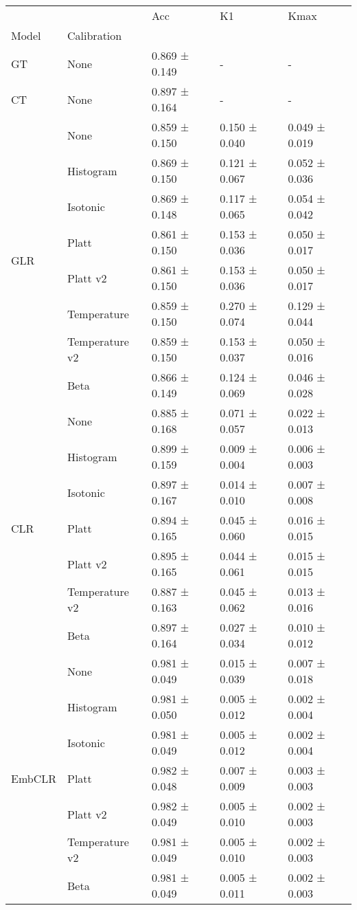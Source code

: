 \begin{tabular}{lllll}
\toprule
 &  & Acc & K1 & Kmax \\
Model & Calibration &  &  &  \\
\midrule
GT & None & 0.869 ± 0.149 & - & - \\
\cline{1-5}
CT & None & 0.897 ± 0.164 & - & - \\
\cline{1-5}
\multirow[t]{8}{*}{GLR} & None & 0.859 ± 0.150 & 0.150 ± 0.040 & 0.049 ± 0.019 \\
 & Histogram & 0.869 ± 0.150 & 0.121 ± 0.067 & 0.052 ± 0.036 \\
 & Isotonic & 0.869 ± 0.148 & 0.117 ± 0.065 & 0.054 ± 0.042 \\
 & Platt & 0.861 ± 0.150 & 0.153 ± 0.036 & 0.050 ± 0.017 \\
 & Platt v2 & 0.861 ± 0.150 & 0.153 ± 0.036 & 0.050 ± 0.017 \\
 & Temperature & 0.859 ± 0.150 & 0.270 ± 0.074 & 0.129 ± 0.044 \\
 & Temperature v2 & 0.859 ± 0.150 & 0.153 ± 0.037 & 0.050 ± 0.016 \\
 & Beta & 0.866 ± 0.149 & 0.124 ± 0.069 & 0.046 ± 0.028 \\
\cline{1-5}
\multirow[t]{7}{*}{CLR} & None & 0.885 ± 0.168 & 0.071 ± 0.057 & 0.022 ± 0.013 \\
 & Histogram & 0.899 ± 0.159 & 0.009 ± 0.004 & 0.006 ± 0.003 \\
 & Isotonic & 0.897 ± 0.167 & 0.014 ± 0.010 & 0.007 ± 0.008 \\
 & Platt & 0.894 ± 0.165 & 0.045 ± 0.060 & 0.016 ± 0.015 \\
 & Platt v2 & 0.895 ± 0.165 & 0.044 ± 0.061 & 0.015 ± 0.015 \\
 & Temperature v2 & 0.887 ± 0.163 & 0.045 ± 0.062 & 0.013 ± 0.016 \\
 & Beta & 0.897 ± 0.164 & 0.027 ± 0.034 & 0.010 ± 0.012 \\
\cline{1-5}
\multirow[t]{7}{*}{EmbCLR} & None & 0.981 ± 0.049 & 0.015 ± 0.039 & 0.007 ± 0.018 \\
 & Histogram & 0.981 ± 0.050 & 0.005 ± 0.012 & 0.002 ± 0.004 \\
 & Isotonic & 0.981 ± 0.049 & 0.005 ± 0.012 & 0.002 ± 0.004 \\
 & Platt & 0.982 ± 0.048 & 0.007 ± 0.009 & 0.003 ± 0.003 \\
 & Platt v2 & 0.982 ± 0.049 & 0.005 ± 0.010 & 0.002 ± 0.003 \\
 & Temperature v2 & 0.981 ± 0.049 & 0.005 ± 0.010 & 0.002 ± 0.003 \\
 & Beta & 0.981 ± 0.049 & 0.005 ± 0.011 & 0.002 ± 0.003 \\
\cline{1-5}
\bottomrule
\end{tabular}
